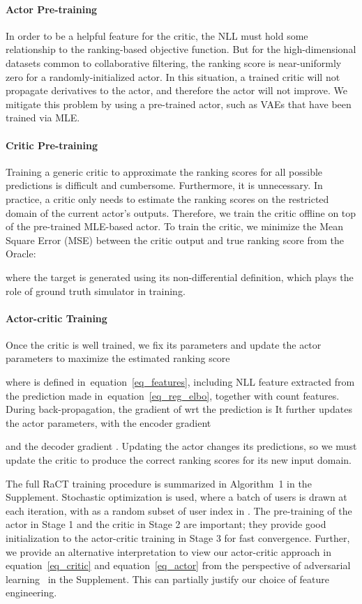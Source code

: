 \documentclass{article} \usepackage{iclr2020_conference,times}
\def\eqref#1{equation~\ref{#1}}
\begin{document}
\paragraph{Actor Pre-training} In order to be a helpful feature for the critic, the NLL must hold some relationship to the ranking-based objective function. But for the high-dimensional datasets common to collaborative filtering, the ranking score is near-uniformly zero for a randomly-initialized actor. In this situation, a trained critic will not propagate derivatives to the actor, and therefore the actor will not improve. We mitigate this problem by using a pre-trained actor, such as VAEs that have been trained via MLE.

\paragraph{Critic Pre-training}
Training a generic critic to approximate the ranking scores for all possible predictions is difficult and cumbersome. Furthermore, it is unnecessary. 
In practice, a critic only needs to estimate the ranking scores on the restricted domain of the current actor's outputs. Therefore, we train the critic offline on top of the pre-trained MLE-based actor.
To train the critic, we minimize the Mean Square Error (MSE) between the critic output and true ranking score  from the Oracle:

where the target  is generated using its non-differential definition, which plays the role of ground truth simulator in training.

\paragraph{Actor-critic Training} 
Once the critic is well trained, we fix its parameters  and update the actor parameters  to maximize the estimated ranking score

where  is defined in~\eqref{eq_features},
including NLL feature extracted from the prediction made in~\eqref{eq_reg_elbo}, together with count features. 
During back-propagation, the gradient of  wrt the prediction  is
 It further updates the actor parameters, with the encoder gradient 

and the decoder gradient 
.
Updating the actor changes its predictions, so we must update the critic to produce the correct ranking scores for its new input domain.

The full RaCT training procedure is summarized in Algorithm~1 in the Supplement.
Stochastic optimization is used, where a batch of users 
  is drawn at each iteration, with  as a random subset of user index in . The pre-training of the actor in Stage 1 and the critic in Stage 2 are important; they provide good initialization to the actor-critic training in Stage 3 for fast convergence. Further, we provide an alternative interpretation to view our actor-critic approach in \eqref{eq_critic} and \eqref{eq_actor} from the perspective of adversarial learning~\citep{goodfellow2014generative} in the Supplement. This can partially justify our choice of feature engineering.
\end{document}
